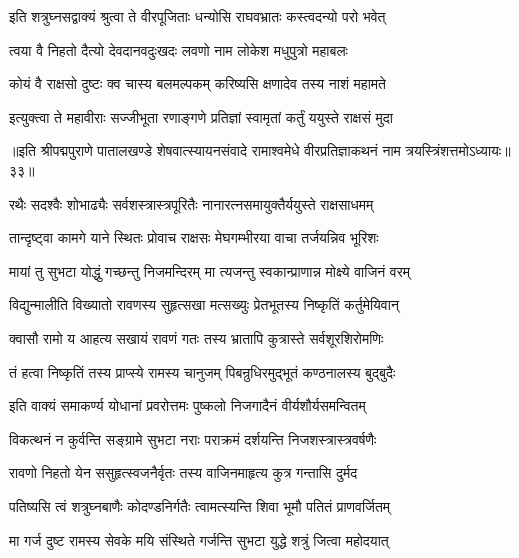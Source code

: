 \twolineshloka
{इति शत्रुघ्नसद्वाक्यं श्रुत्वा ते वीरपूजिताः}
{धन्योसि राघवभ्रातः कस्त्वदन्यो परो भवेत्}%

\twolineshloka
{त्वया वै निहतो दैत्यो देवदानवदुःखदः}
{लवणो नाम लोकेश मधुपुत्रो महाबलः}%

\twolineshloka
{कोयं वै राक्षसो दुष्टः क्व चास्य बलमल्पकम्}
{करिष्यसि क्षणादेव तस्य नाशं महामते}%

\twolineshloka
{इत्युक्त्वा ते महावीराः सज्जीभूता रणाङ्गणे}
{प्रतिज्ञां स्वामृतां कर्तुं ययुस्ते राक्षसं मुदा}%

॥इति श्रीपद्मपुराणे पातालखण्डे शेषवात्स्यायनसंवादे रामाश्वमेधे वीरप्रतिज्ञाकथनं नाम त्रयस्त्रिंशत्तमोऽध्यायः॥३३॥



\twolineshloka
{रथैः सदश्वैः शोभाढ्यैः सर्वशस्त्रास्त्रपूरितैः}
{नानारत्नसमायुक्तैर्ययुस्ते राक्षसाधमम्}%

\twolineshloka
{तान्दृष्ट्वा कामगे याने स्थितः प्रोवाच राक्षसः}
{मेघगम्भीरया वाचा तर्जयन्निव भूरिशः}%

\twolineshloka
{मायां तु सुभटा योद्धुं गच्छन्तु निजमन्दिरम्}
{मा त्यजन्तु स्वकान्प्राणान्न मोक्ष्ये वाजिनं वरम्}%

\twolineshloka
{विद्युन्मालीति विख्यातो रावणस्य सुहृत्सखा}
{मत्सख्युः प्रेतभूतस्य निष्कृतिं कर्तुमेयिवान्}%

\twolineshloka
{क्वासौ रामो य आहत्य सखायं रावणं गतः}
{तस्य भ्रातापि कुत्रास्ते सर्वशूरशिरोमणिः}%

\twolineshloka
{तं हत्वा निष्कृतिं तस्य प्राप्स्ये रामस्य चानुजम्}
{पिबन्रुधिरमुद्भूतं कण्ठनालस्य बुद्बुदैः}%

\twolineshloka
{इति वाक्यं समाकर्ण्य योधानां प्रवरोत्तमः}
{पुष्कलो निजगादैनं वीर्यशौर्यसमन्वितम्}%


\twolineshloka
{विकत्थनं न कुर्वन्ति सङ्ग्रामे सुभटा नराः}
{पराक्रमं दर्शयन्ति निजशस्त्रास्त्रवर्षणैः}%

\twolineshloka
{रावणो निहतो येन ससुहृत्स्वजनैर्वृतः}
{तस्य वाजिनमाहृत्य कुत्र गन्तासि दुर्मद}%

\twolineshloka
{पतिष्यसि त्वं शत्रुघ्नबाणैः कोदण्डनिर्गतैः}
{त्वामत्स्यन्ति शिवा भूमौ पतितं प्राणवर्जितम्}%

\twolineshloka
{मा गर्ज दुष्ट रामस्य सेवके मयि संस्थिते}
{गर्जन्ति सुभटा युद्धे शत्रुं जित्वा महोदयात्}%


